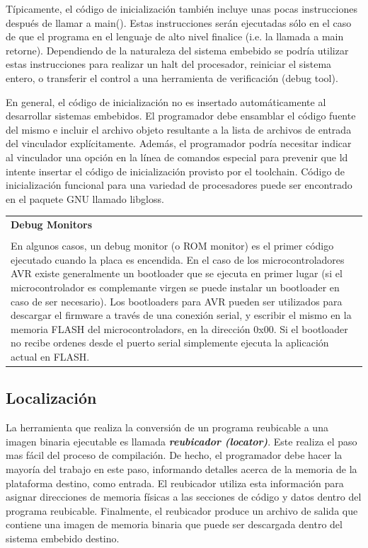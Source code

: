 \documentclass[output=paper, 
colorlinks,
citecolor=brown,
newtxmath
]{langscibook}
\begin{document}
Típicamente, el código de inicialización también incluye unas pocas
instrucciones después de llamar a main(). Estas instrucciones serán ejecutadas
sólo en el caso de que el programa en el lenguaje de alto nivel finalice (i.e.
la llamada a main retorne). Dependiendo de la naturaleza del sistema embebido
se podría utilizar estas instrucciones para realizar un halt del procesador, 
reiniciar el sistema entero, o transferir el control a una herramienta
de verificación (debug tool).

En general, el código de inicialización no es insertado automáticamente al desarrollar sistemas embebidos. El
programador debe ensamblar el código fuente del mismo e incluir el archivo objeto resultante a la 
lista de archivos de entrada del vinculador explícitamente. Además, el programador
podría necesitar indicar al vinculador una opción en la línea de comandos especial
para prevenir que ld intente insertar el código de inicialización provisto
por el toolchain.
Código de inicialización funcional para una variedad de procesadores puede
ser encontrado en el paquete GNU llamado libgloss.


\begin{center}
\begin{tabularx}{\textwidth}{|X|}
\hline
\rowcolor{lightgray}
\textbf{Debug Monitors} \\ \\
En algunos casos, un debug monitor (o ROM monitor) es el primer código
ejecutado cuando la placa es encendida. En el caso de los microcontroladores
AVR existe generalmente un bootloader que se ejecuta en primer lugar (si
el microcontrolador es complemante virgen se puede instalar un 
bootloader en caso de ser necesario).
Los bootloaders para AVR pueden ser utilizados
para descargar el firmware a través de una conexión serial, y escribir
el mismo en la memoria FLASH del microcontroladors, en la dirección 0x00.
Si el bootloader no recibe ordenes desde el puerto serial simplemente 
ejecuta la aplicación actual en FLASH.\\
\hline
\end{tabularx}
\end{center}


\subsection {Localización}

La herramienta que realiza la conversión de un programa reubicable a
una imagen binaria ejecutable es llamada \textit{\textbf{reubicador (locator)}}.
Este realiza el paso mas fácil del proceso de compilación. De hecho, 
el programador debe hacer la mayoría del trabajo en este paso, informando
detalles acerca de la memoria de la plataforma destino, como entrada.
El reubicador utiliza esta información para asignar direcciones
de memoria físicas a las secciones de código y datos dentro del programa
reubicable. Finalmente, el reubicador produce un archivo de salida que contiene
una imagen de memoria binaria que puede ser descargada dentro del sistema
embebido destino.
\end{document}
